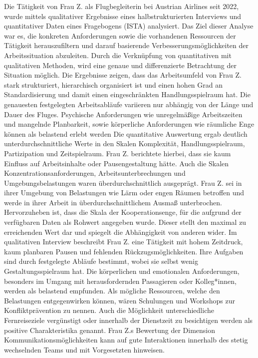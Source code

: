 \documentclass[12pt, a4paper]{article}
\begin{document}
Die Tätigkeit von Frau Z. als Flugbegleiterin bei Austrian Airlines seit 2022, wurde mittels qualitativer Ergebnisse eines 
halbstrukturierten Interviews und quantitativer Daten eines Fragebogens (ISTA) analysiert.
Das Ziel dieser Analyse war es, die konkreten Anforderungen sowie die vorhandenen Ressourcen der Tätigkeit herauszufiltern 
und darauf basierende Verbesserungsmöglichkeiten der Arbeitssituation abzuleiten.
Durch die Verknüpfung von quantitativen mit qualitativen Methoden, wird eine genaue und differenzierte Betrachtung der Situation möglich.
Die Ergebnisse zeigen, dass das Arbeitsumfeld von Frau Z. stark strukturiert, hierarchisch organisiert ist und einen hohen Grad 
an Standardisierung und damit einen eingeschränkten Handlungsspielraum hat. Die genauesten festgelegten Arbeitsabläufe 
variieren nur abhängig von der Länge und Dauer des Fluges. Psychische Anforderungen wie unregelmäßige Arbeitszeiten und mangelnde Planbarkeit, 
sowie körperliche Anforderungen wie räumliche Enge können als belastend erlebt werden
Die quantitative Auswertung ergab deutlich unterdurchschnittliche Werte in den Skalen Komplexität, Handlungsspielraum, 
Partizipation und Zeitspielraum. Frau Z. berichtete hierbei, dass sie kaum Einfluss auf Arbeitsinhalte oder Pausengestaltung hätte. 
Auch die Skalen Konzentrationsanforderungen, Arbeitsunterbrechungen und Umgebungsbelastungen waren überdurchschnittlich ausgeprägt. 
Frau Z. sei in ihrer Umgebung von Belastungen wie Lärm oder engen Räumen betroffen und werde in ihrer Arbeit in überdurchschnittlichem 
Ausmaß unterbrochen. Hervorzuheben ist, dass die Skala der Kooperationsenge, für die aufgrund der verfügbaren Daten als Rohwert angegeben wurde.
Dieser stellt den maximal zu erreichenden Wert dar und spiegelt die Abhängigkeit von anderen wider.
Im qualitativen Interview beschreibt Frau Z. eine Tätigkeit mit hohem Zeitdruck, kaum planbaren Pausen und fehlenden Rückzugsmöglichkeiten.
Ihre Aufgaben sind durch festgelegte Abläufe bestimmt, wobei sie selbst wenig Gestaltungsspielraum hat. 
Die körperlichen und emotionalen Anforderungen, besonders im Umgang mit herausfordernden Passagieren oder Kolleg*innen, 
werden als belastend empfunden.
Als mögliche Ressourcen, welche den Belastungen entgegenwirken können, wären Schulungen und Workshops zur Konfliktprävention zu nennen. 
Auch die Möglichkeit unterschiedliche Fernreiseziele vergünstigt oder innerhalb der Dienstzeit zu besichtigen werden 
als positive Charakteristika genannt. Frau Z.s Bewertung der Dimension Kommunikationsmöglichkeiten kann auf gute Interaktionen 
innerhalb des stetig wechselnden Teams und mit Vorgesetzten hinweisen.


\newpage
\printbibliography
\end{document}
